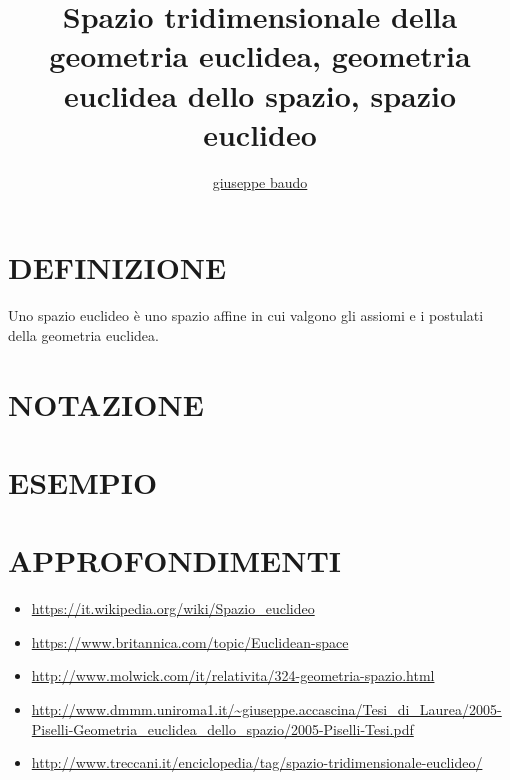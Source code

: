 \documentclass[a4paper,10pt]{article}
\title{Spazio tridimensionale della geometria euclidea, geometria euclidea dello spazio, spazio euclideo}
\author{\href{http://www.baudo.hol.es}{giuseppe baudo}}
\begin{document}
\maketitle

\section{DEFINIZIONE}
Uno spazio euclideo è uno spazio affine in cui valgono gli assiomi e i postulati della geometria euclidea.

\section{NOTAZIONE}

\section{ESEMPIO}

\section{APPROFONDIMENTI}
\begin{itemize}
 \item \url{https://it.wikipedia.org/wiki/Spazio_euclideo}
 \item \url{https://www.britannica.com/topic/Euclidean-space}
 \item \url{http://www.molwick.com/it/relativita/324-geometria-spazio.html}
 \item \url{http://www.dmmm.uniroma1.it/~giuseppe.accascina/Tesi_di_Laurea/2005-Piselli-Geometria_euclidea_dello_spazio/2005-Piselli-Tesi.pdf}
 \item \url{http://www.treccani.it/enciclopedia/tag/spazio-tridimensionale-euclideo/}
\end{itemize}
\end{document}
